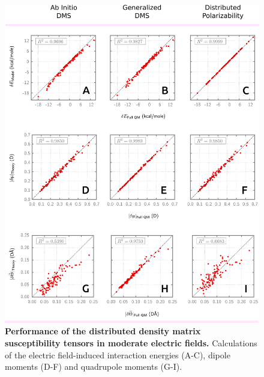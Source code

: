 \documentclass[aip,amsmath,amssymb,reprint]{revtex4-1}
\begin{document}
\begin{figure}
\includegraphics[width=\textwidth]{data/dmatpol/water/figure1/fig-1.eps}
\caption{\label{f:results} {\bf Performance of the distributed density matrix susceptibility tensors in moderate
electric fields.}
Calculations of the electric field\hyp{}induced interaction energies (A-C), dipole moments (D-F) and
quadrupole moments (G-I).}
\end{figure}

\end{document}
